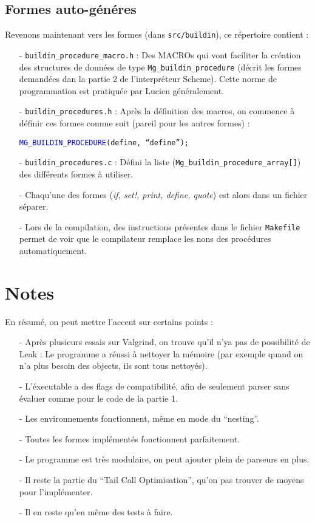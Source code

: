 \documentclass[11pt]{article}
\begin{document}
\subsection{Formes auto-g\'en\'eres}
Revenons maintenant vers les formes (dans \texttt{src/buildin}), ce r\'epertoire contient :
\begin{itemize}
\item[-] \texttt{buildin\_procedure\_macro.h} : Des MACROs qui vont faciliter la cr\'eation des structures de donn\'ees de type \texttt{Mg\_buildin\_procedure} (d\'ecrit les formes demand\'ees dan la partie 2 de l'interpr\'eteur Scheme). Cette norme de programmation est pratiqu\'ee par Lucien g\'en\'eralement.
\item[-] \texttt{buildin\_procedures.h} : Apr\`es la d\'efinition des macros, on commence \`a d\'efinir ces formes comme suit (pareil pour les autres formes) :

	\texttt{\textcolor{blue}{MG\_BUILDIN\_PROCEDURE}(define, ``define'');}
\item[-] \texttt{buildin\_procedures.c} : D\'efini la liste (\texttt{Mg\_buildin\_procedure\_array[]}) des diff\'erents formes \`a utiliser.
\item[-] Chaqu'une des formes (\textit{if, set!, print, define, quote}) est alors dans un fichier s\'eparer.
\item[-] Lors de la compilation, des instructions pr\'esentes dans le fichier \texttt{Makefile} permet de voir que le compilateur remplace les nons des proc\'edures automatiquement.

\end{itemize}

\section{Notes}
En r\'esum\'e, on peut mettre l'accent sur certains points :

\begin{itemize}
\item[-] Apr\`es plusieurs essais sur Valgrind, on trouve qu'il n'ya pas de possibilit\'e de Leak : Le programme a r\'eussi \`a nettoyer la m\'emoire (par exemple quand on n'a plus besoin des objects, ils sont tous nettoy\'es).
\item[-] L'\'executable a des flags de compatibilit\'e, afin de seulement parser sans \'evaluer comme pour le code de la partie 1.
\item[-] Les environnements fonctionnent, m\^eme en mode du ``nesting''.
\item[-] Toutes les formes impl\'ement\'es fonctionnent parfaitement.
\item[-] Le programme est tr\`es modulaire, on peut ajouter plein de parseurs en plus.
\item[-] Il reste la partie du ``Tail Call Optimisation'', qu'on pas trouver de moyens pour l'impl\'ementer.
\item[-] Il en reste qu'en m\^eme des tests \`a faire.

\end{itemize}
\end{document}
